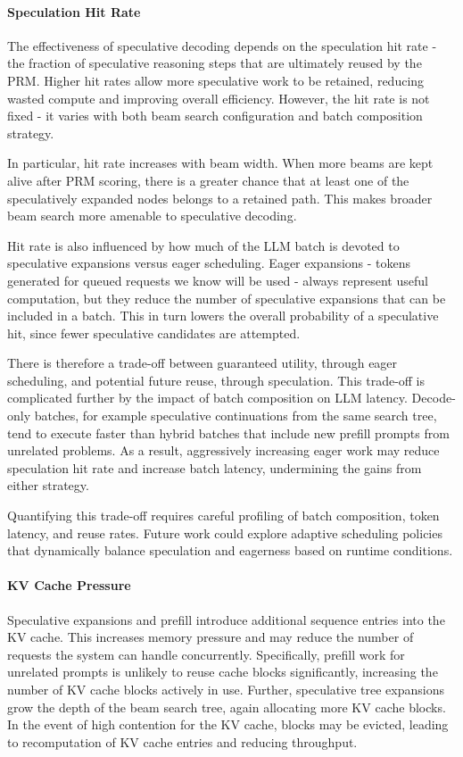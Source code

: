 \documentclass[12pt,twoside]{report}
\begin{document}
\paragraph{Speculation Hit Rate}

The effectiveness of speculative decoding depends on the speculation hit rate - the fraction of speculative reasoning steps that are ultimately reused by the PRM.  
Higher hit rates allow more speculative work to be retained, reducing wasted compute and improving overall efficiency.  
However, the hit rate is not fixed - it varies with both beam search configuration and batch composition strategy.

In particular, hit rate increases with beam width.  
When more beams are kept alive after PRM scoring, there is a greater chance that at least one of the speculatively expanded nodes belongs to a retained path.  
This makes broader beam search more amenable to speculative decoding.

Hit rate is also influenced by how much of the LLM batch is devoted to speculative expansions versus eager scheduling.  
Eager expansions - tokens generated for queued requests we know will be used - always represent useful computation, but they reduce the number of speculative expansions that can be included in a batch.  
This in turn lowers the overall probability of a speculative hit, since fewer speculative candidates are attempted.

There is therefore a trade-off between guaranteed utility, through eager scheduling, and potential future reuse, through speculation.  
This trade-off is complicated further by the impact of batch composition on LLM latency.  
Decode-only batches, for example speculative continuations from the same search tree, tend to execute faster than hybrid batches that include new prefill prompts from unrelated problems.  
As a result, aggressively increasing eager work may reduce speculation hit rate and increase batch latency, undermining the gains from either strategy.

Quantifying this trade-off requires careful profiling of batch composition, token latency, and reuse rates.  
Future work could explore adaptive scheduling policies that dynamically balance speculation and eagerness based on runtime conditions.

\paragraph{KV Cache Pressure}
Speculative expansions and prefill introduce additional sequence entries into the KV cache. 
This increases memory pressure and may reduce the number of requests the system can handle concurrently. 
Specifically, prefill work for unrelated prompts is unlikely to reuse cache blocks significantly, increasing the number of KV cache blocks actively in use. 
Further, speculative tree expansions grow the depth of the beam search tree, again allocating more KV cache blocks.
In the event of high contention for the KV cache, blocks may be evicted, leading to recomputation of KV cache entries and reducing throughput.
\end{document}
